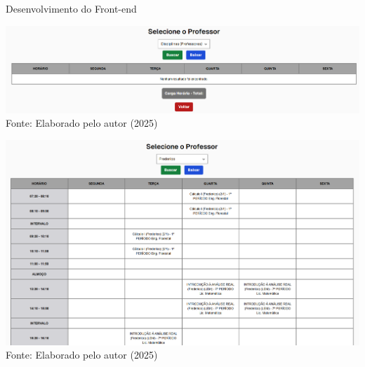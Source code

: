 \begin{frame}{Desenvolvimento do Front-end}
    \begin{minipage}{0.48\textwidth}
        \centering
        \includegraphics[width=1\textwidth]{figuras/front-5.png}
        \footnotesize Fonte: Elaborado pelo autor (2025)
    \end{minipage}
    \hfill
    \begin{minipage}{0.48\textwidth}
        \centering
        \includegraphics[width=1\textwidth]{figuras/front-6.png}
        \footnotesize Fonte: Elaborado pelo autor (2025)
    \end{minipage}
\end{frame}

